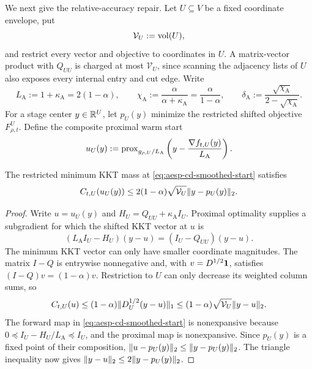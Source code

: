We next give the relative-accuracy repair.  Let $U\subseteq V$ be a fixed
coordinate envelope, put
\begin{equation*}
 \mathcal V_U:=\operatorname{vol}(U),
\end{equation*}
and restrict every vector and objective to coordinates in $U$.  A matrix-vector
product with $Q_{UU}$ is charged at most $\mathcal V_U$, since scanning the
adjacency lists of $U$ also exposes every internal entry and cut edge.  Write
\begin{equation}
 L_{\mathrm A}:=1+\kappa_{\mathrm A}=2(1-\alpha),
 \qquad
 \chi_{\mathrm A}:=\frac{\alpha}{\alpha+\kappa_{\mathrm A}}
               =\frac{\alpha}{1-\alpha},
 \qquad
 \delta_{\mathrm A}:=
 \frac{\sqrt{\chi_{\mathrm A}}}{2-\sqrt{\chi_{\mathrm A}}}.
 \label{eq:aesp-cd-relative-parameters}
\end{equation}
For a stage center $y\in\mathbb{R}^U$, let $p_U(y)$ minimize the restricted shifted
objective $F_{\rho,t}^U$.  Define the composite proximal warm start
\begin{equation}
 u_U(y):=\operatorname{prox}_{g_{\rho,U}/L_{\mathrm A}}
 \left(y-\frac{\nabla f_{t,U}(y)}{L_{\mathrm A}}\right).
 \label{eq:aesp-cd-smoothed-start}
\end{equation}

\begin{lemma}
\label{lem:aesp-cd-smoothed-mass}
The restricted minimum KKT mass at \cref{eq:aesp-cd-smoothed-start} satisfies
\begin{equation}
 C_{t,U}(u_U(y))
 \leq 2(1-\alpha)\sqrt{\mathcal V_U}
       \lVert y-p_U(y)\rVert_2.
 \label{eq:aesp-cd-smoothed-mass}
\end{equation}
\end{lemma}

\begin{proof}
Write $u=u_U(y)$ and $H_U=Q_{UU}+\kappa_{\mathrm A}I_U$.  Proximal
optimality supplies a subgradient for which the shifted KKT vector at $u$ is
\begin{equation*}
 (L_{\mathrm A}I_U-H_U)(y-u)=(I_U-Q_{UU})(y-u).
\end{equation*}
The minimum KKT vector can only have smaller coordinate magnitudes.  The
matrix $I-Q$ is entrywise nonnegative and, with
$v=D^{1/2}\mathbf{1}$, satisfies $(I-Q)v=(1-\alpha)v$.  Restriction to $U$ can
only decrease its weighted column sums, so
\begin{equation*}
 C_{t,U}(u)
 \leq(1-\alpha)\lVert D_U^{1/2}(y-u)\rVert_1
 \leq(1-\alpha)\sqrt{\mathcal V_U}\lVert y-u\rVert_2.
\end{equation*}
The forward map in \cref{eq:aesp-cd-smoothed-start} is nonexpansive because
$0\preceq I_U-H_U/L_{\mathrm A}\preceq I_U$, and the proximal map is
nonexpansive.  Since $p_U(y)$ is a fixed point of their composition,
$\lVert u-p_U(y)\rVert_2\leq\lVert y-p_U(y)\rVert_2$.  The triangle inequality now gives
$\lVert y-u\rVert_2\leq2\lVert y-p_U(y)\rVert_2$.
\end{proof}

